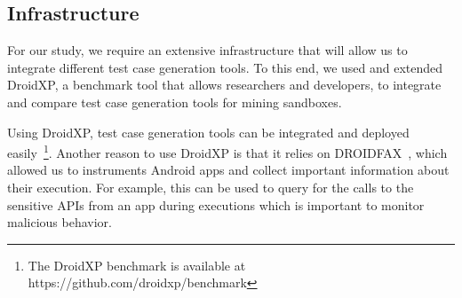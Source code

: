 \subsection{Infrastructure}\label{sec:infra}

For our study, we require an extensive infrastructure that will allow us to integrate different test case generation tools. To this end, we used and extended DroidXP\cite{DBLP:conf/scam/CostaMCMVBC20}, a benchmark tool that allows researchers and developers, to integrate and compare test case generation tools for mining sandboxes.

Using DroidXP, test case generation tools can be integrated and deployed easily~\footnote{The DroidXP benchmark is available at https://github.com/droidxp/benchmark}. Another reason to use DroidXP is that it relies on DROIDFAX~\cite{cai2016understanding}, which allowed us to instruments Android apps and collect important information about their execution. For example, this can be used to query for the calls to the sensitive APIs from an app during executions which is important to monitor malicious behavior. 

